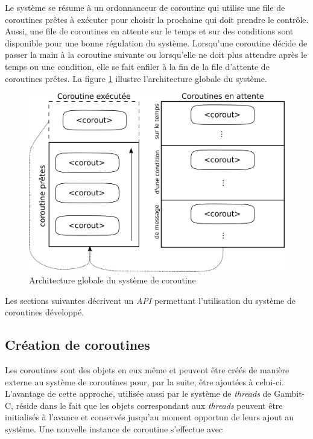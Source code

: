 \documentclass[12pt,twoside,letterpaper,francais]{book}
\begin{document}
Le système se résume à un ordonnanceur de coroutine qui utilise une
file de coroutines prêtes à exécuter pour choisir la prochaine qui
doit prendre le contrôle. Aussi, une file de coroutines en attente sur
le temps et sur des conditions sont disponible pour une bonne
régulation du système. Lorsqu'une coroutine décide de passer la main à
la coroutine suivante ou lorsqu'elle ne doit plus attendre après le
temps ou une condition, elle se fait enfiler à la fin de la file
d'attente de coroutines prêtes. La figure \ref{Corout:system-schema}
illustre l'architecture globale du système.

\begin{figure}[htb!]
  \center
  \includegraphics[scale=0.7]{corout-system}
  \caption{Architecture globale du système de coroutine}
  \label{Corout:system-schema}
\end{figure}

 Les sections suivantes décrivent un \textit{API} permettant
l'utilisation du système de coroutines développé.


\FloatBarrier
\subsection{Création de coroutines}
Les coroutines sont des objets en eux même et peuvent être créés de
manière externe au système de coroutines pour, par la suite, être
ajoutées à celui-ci. L'avantage de cette approche, utilisée aussi par
le système de \textit{threads} de Gambit-C, réside dans le fait que
les objets correspondant aux \textit{threads} peuvent être initialisés
à l'avance et conservés jusqu'au moment opportun de leurs ajout au
système. Une nouvelle instance de coroutine s'effectue avec
\end{document}

